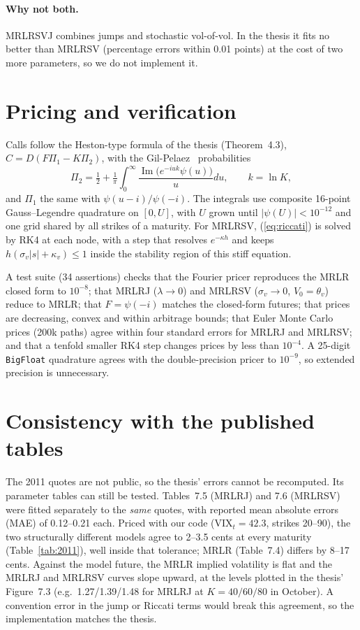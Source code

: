 \documentclass[10pt,twocolumn]{article}
\newcommand{\VIX}{\mathrm{VIX}}
\begin{document}
\paragraph{Why not both.}
MRLRSVJ combines jumps and stochastic vol-of-vol. In the thesis it fits no better than
MRLRSV (percentage errors within 0.01 points) at the cost of two more parameters,
so we do not implement it.

\section{Pricing and verification}
Calls follow the Heston-type formula of the thesis (Theorem~4.3), $C=D(F\Pi_1-K\Pi_2)$,
with the Gil-Pelaez~\citep{gilpelaez1951} probabilities
\[
\Pi_2=\tfrac12+\tfrac1\pi\!\int_0^\infty\!\!\frac{\operatorname{Im}\big(e^{-iuk}\psi(u)\big)}{u}du,
\qquad k=\ln K,
\]
and $\Pi_1$ the same with $\psi(u-i)/\psi(-i)$. The integrals use composite 16-point
Gauss--Legendre quadrature on $[0,U]$, with $U$ grown until $|\psi(U)|<10^{-12}$ and
one grid shared by all strikes of a maturity. For MRLRSV, (\ref{eq:riccati}) is solved
by RK4 at each node, with a step that resolves $e^{-\kappa h}$ and keeps
$h(\sigma_v|s|+\kappa_v)\le1$ inside the stability region of this stiff equation.

A test suite (34 assertions) checks that the Fourier pricer reproduces the MRLR closed
form to $10^{-8}$; that MRLRJ ($\lambda\to0$) and MRLRSV ($\sigma_v\to0$,
$V_0=\theta_v$) reduce to MRLR; that $F=\psi(-i)$ matches the closed-form futures;
that prices are decreasing, convex and within arbitrage bounds; that Euler Monte
Carlo prices (200k paths) agree within four standard errors for MRLRJ and MRLRSV;
and that a tenfold smaller RK4 step changes prices by less than $10^{-4}$. A
25-digit \texttt{BigFloat} quadrature agrees with the double-precision pricer to
$10^{-9}$, so extended precision is unnecessary.

\section{Consistency with the published tables}
The 2011 quotes are not public, so the thesis' errors cannot be recomputed. Its
parameter tables can still be tested. Tables~7.5 (MRLRJ) and 7.6 (MRLRSV) were fitted
separately to the \emph{same} quotes, with reported mean absolute errors (MAE)
of 0.12--0.21 each. Priced with our code ($\VIX_t=42.3$, strikes 20--90), the two
structurally different models agree to 2--3.5 cents at every maturity
(Table~\ref{tab:2011}), well inside that tolerance; MRLR (Table~7.4) differs by
8--17 cents. Against the model future, the MRLR implied volatility is flat and the
MRLRJ and MRLRSV curves slope upward, at the levels plotted in the thesis'
Figure~7.3 (e.g.\ 1.27/1.39/1.48 for MRLRJ at $K=40/60/80$ in October). A
convention error in the jump or Riccati terms would break this agreement, so the
implementation matches the thesis.
\end{document}
